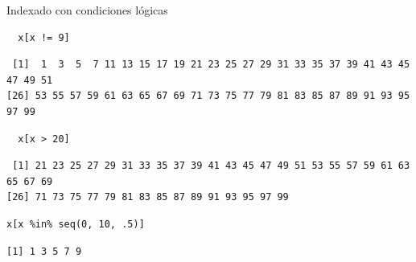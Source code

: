 \documentclass[aspectratio=169, usenames,svgnames,dvipsnames]{beamer}
\begin{document}
\begin{frame}[label={sec:orgd025606},fragile]{Indexado con condiciones lógicas}
 \lstset{language=r,label= ,caption= ,captionpos=b,numbers=none}
\begin{lstlisting}
  x[x != 9]
\end{lstlisting}

\begin{verbatim}
 [1]  1  3  5  7 11 13 15 17 19 21 23 25 27 29 31 33 35 37 39 41 43 45 47 49 51
[26] 53 55 57 59 61 63 65 67 69 71 73 75 77 79 81 83 85 87 89 91 93 95 97 99
\end{verbatim}


\lstset{language=r,label= ,caption= ,captionpos=b,numbers=none}
\begin{lstlisting}
  x[x > 20]
\end{lstlisting}

\begin{verbatim}
 [1] 21 23 25 27 29 31 33 35 37 39 41 43 45 47 49 51 53 55 57 59 61 63 65 67 69
[26] 71 73 75 77 79 81 83 85 87 89 91 93 95 97 99
\end{verbatim}


\lstset{language=r,label= ,caption= ,captionpos=b,numbers=none}
\begin{lstlisting}
x[x %in% seq(0, 10, .5)]
\end{lstlisting}

\begin{verbatim}
[1] 1 3 5 7 9
\end{verbatim}
\end{frame}
\end{document}
